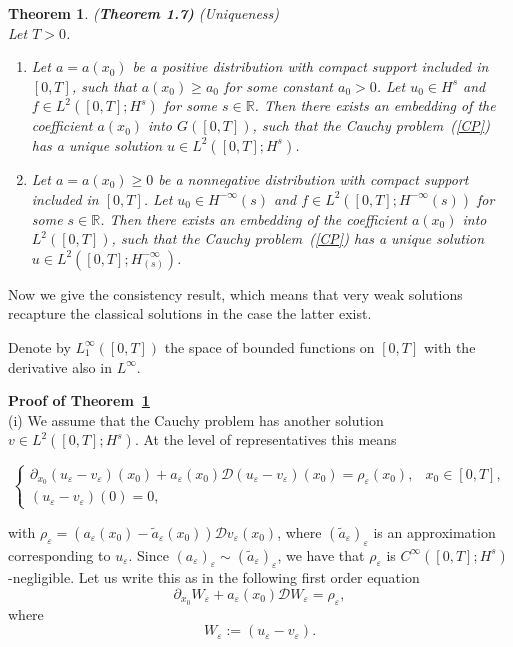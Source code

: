 \documentclass[12pt]{amsart}
\newtheorem{theorem}{Theorem}[section]
\theoremstyle{definition}
\begin{document}
\newpage



\begin{theorem}{(\bf Theorem 1.7)}
\label{th1.7}(Uniqueness)\\
Let $T > 0$.
\begin{enumerate}
    \item[(i)] Let $a = a(x_0)$ be a positive distribution with compact support included in $[0, T]$, such that $a(x_0) \geq a_0$ for some constant $a_0 > 0$. Let $u_0 \in H^s$ and $f \in L^2([0, T]; H^s)$ for some $s \in \mathbb{R}$. Then there exists an embedding of the coefficient $a(x_0)$ into $G([0, T])$, such that the Cauchy problem~(\ref{CP}) has a unique solution $u \in L^2([0, T]; H^s)$.
    
    \item[(ii)] Let $a = a(x_0) \geq 0$ be a nonnegative distribution with compact support included in $[0, T]$. Let $u_0\in H^{-\infty}(s)$ and $f \in L^2([0, T]; H^{-\infty}(s))$ for some $s \in \mathbb{R}$. Then there exists an embedding of the coefficient $a(x_0)$ into $L^2([0,T])$, such that the Cauchy problem~(\ref{CP}) has a unique solution $u \in L^2([0,T]; H_{(s)}^{-\infty})$.
\end{enumerate}
\end{theorem}
Now we give the consistency result, which means that very weak solutions recapture the classical solutions in the case the latter exist. 

Denote by $L_{1}^{\infty}([0,T])$ the space of bounded functions on $[0,T]$ with the derivative also in $L^{\infty}$.

\vspace{0.5cm}


\textbf{Proof of Theorem~\ref{th1.7}}\\
(i) We assume that the Cauchy problem has another solution $v \in L^2([0, T]; H^s)$. At the level of representatives this means

\[
\begin{cases}
\partial_{x_0} (u_\varepsilon - v_\varepsilon)(x_0) + a_\varepsilon(x_0)\mathcal{D}(u_\varepsilon - v_\varepsilon)(x_0) = \rho_\varepsilon(x_0), & x_0 \in [0, T], \\
(u_\varepsilon - v_\varepsilon)(0) = 0,
\end{cases}
\]

with  $\rho_\varepsilon = ( a_\varepsilon(x_0)-\widetilde{a}_\varepsilon(x_0) )\mathcal{D}v_\varepsilon(x_0)$, where $(\widetilde{a}_\varepsilon)_\varepsilon$ is an approximation corresponding to $u_\varepsilon$. Since $(a_\varepsilon)_\varepsilon \sim (\widetilde{a}_\varepsilon)_\varepsilon$, we have that $\rho_\varepsilon$ is $C^\infty([0, T]; H^s)$-negligible. Let us write this as in the following first order equation
\[
\partial_{x_0} W_{\varepsilon} +  a_\varepsilon(x_0)\mathcal{D}  W_{\varepsilon} =\rho_\varepsilon,
\]
where
\[
W_{\varepsilon} := (u_\varepsilon - v_\varepsilon).
\]
\end{document}
